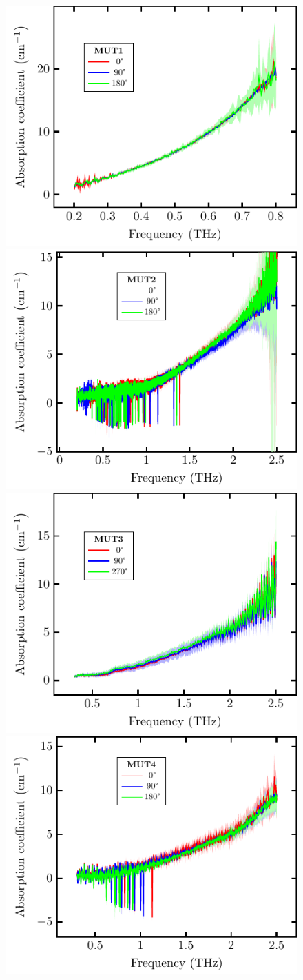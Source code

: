 \begin{figure}[H]
\centering
\subcaptionbox{\label{fig:ceramic_MUT1_abs}}
    {\hspace*{-2em}\includegraphics[width=0.45\linewidth]{images/appendix/plots/real_abs/MUT1.pdf}}
\qquad
\subcaptionbox{\label{fig:ceramic_MUT2_abs}}
    {\hspace*{-2em}\includegraphics[width=0.45\linewidth]{images/appendix/plots/real_abs/MUT2.pdf}}
\subcaptionbox{\label{fig:ceramic_MUT3_abs}}
    {\hspace*{-2em}\includegraphics[width=0.45\linewidth]{images/appendix/plots/real_abs/MUT3.pdf}}
\qquad
\subcaptionbox{\label{fig:ceramic_MUT4_abs}}
    {\hspace*{-2em}\includegraphics[width=0.45\linewidth]{images/appendix/plots/real_abs/MUT4.pdf}}

\end{figure}
